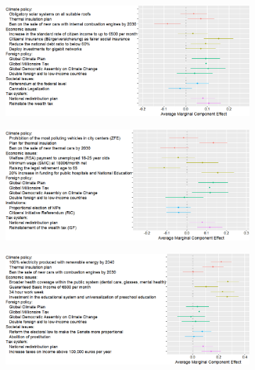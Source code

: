 \begin{figure}[h] 
    \caption[Preferences for various policies in political platforms (English)]{Effects of the presence of a policy (rather than none from this domain) in a random platform on the likelihood that it is preferred to another random platform. (See original translations in Figure \ref{fig:ca_r}; Question \ref{q:conjoint_r}%
    )}\label{fig:ca_r_en}
      \begin{subfigure}{.97\textwidth}
        \includegraphics[width=.97\textwidth]{../figures/DE/ca_r_en.png}
      \end{subfigure}
      \begin{subfigure}{.98\textwidth}
        \includegraphics[width=.98\textwidth]{../figures/FR/ca_r_en.png}
      \end{subfigure}
      \begin{subfigure}{.98\textwidth}
        \includegraphics[width=.98\textwidth]{../figures/ES/ca_r_en.png}
      \end{subfigure}
\end{figure}  

